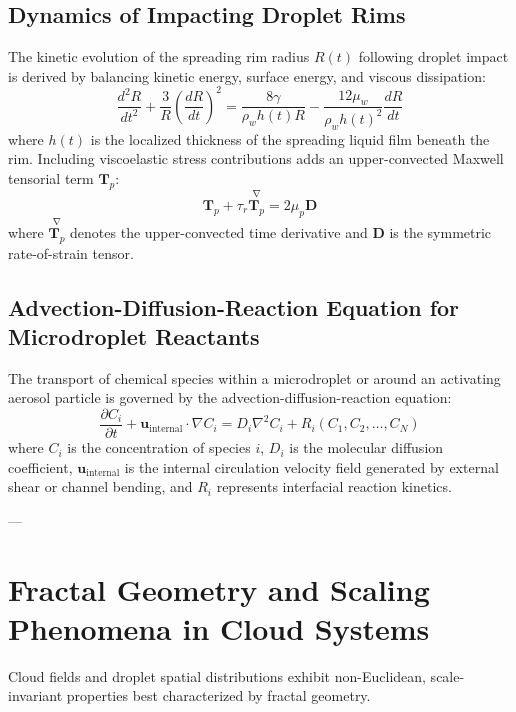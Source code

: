 \documentclass{article}
\begin{document}
\subsection{Dynamics of Impacting Droplet Rims}
The kinetic evolution of the spreading rim radius $R(t)$ following droplet impact is derived by balancing kinetic energy, surface energy, and viscous dissipation:
\begin{equation}
\frac{d^2 R}{dt^2} + \frac{3}{R}\left(\frac{dR}{dt}\right)^2 = \frac{8 \gamma}{\rho_w h(t) R} - \frac{12 \mu_w}{\rho_w h(t)^2} \frac{dR}{dt}
\end{equation}
where $h(t)$ is the localized thickness of the spreading liquid film beneath the rim. Including viscoelastic stress contributions adds an upper-convected Maxwell tensorial term $\mathbf{T}_p$:
\begin{equation}
\mathbf{T}_p + \tau_r \stackrel{\nabla}{\mathbf{T}_p} = 2 \mu_p \mathbf{D}
\end{equation}
where $\stackrel{\nabla}{\mathbf{T}_p}$ denotes the upper-convected time derivative and $\mathbf{D}$ is the symmetric rate-of-strain tensor.

\subsection{Advection-Diffusion-Reaction Equation for Microdroplet Reactants}
The transport of chemical species within a microdroplet or around an activating aerosol particle is governed by the advection-diffusion-reaction equation:
\begin{equation}
\frac{\partial C_i}{\partial t} + \mathbf{u}_{\text{internal}} \cdot \nabla C_i = D_i \nabla^2 C_i + R_i(C_1, C_2, \dots, C_N)
\end{equation}
where $C_i$ is the concentration of species $i$, $D_i$ is the molecular diffusion coefficient, $\mathbf{u}_{\text{internal}}$ is the internal circulation velocity field generated by external shear or channel bending, and $R_i$ represents interfacial reaction kinetics.

---

\section{Fractal Geometry and Scaling Phenomena in Cloud Systems}
\label{sec:fractal_geometry}

Cloud fields and droplet spatial distributions exhibit non-Euclidean, scale-invariant properties best characterized by fractal geometry.
\end{document}
